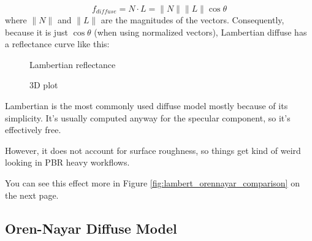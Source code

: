 \documentclass[12pt,letterpaper]{article}
\begin{document}
$$
f_{diffuse} = N \cdot L = \lVert N \rVert \lVert L \rVert \cos \theta
$$
where $\lVert N \rVert$ and $\lVert L \rVert$ are the magnitudes of the vectors. Consequently, 
because it is just $\cos \theta$ (when using normalized vectors), 
Lambertian diffuse has a reflectance curve like this:
\begin{figure}[htbp]
  \begin{minipage}[t]{0.5\linewidth}
    \centering
    \pgfplotsset{width=15em}
    \caption{Lambertian reflectance}
  \end{minipage}
  \hspace{-16pt}
  \begin{minipage}[t]{0.5\linewidth}
    \centering
	\pgfplotsset{width=20em}
    \caption{3D plot}
  \end{minipage}
\end{figure}

Lambertian is the most commonly used diffuse model mostly because of its simplicity. 
It's usually computed anyway for the specular component, so it's effectively free.

However, it does not account for surface roughness, so things get kind of weird looking in PBR heavy workflows.

You can see this effect more in Figure {\color{blue}\ref{fig:lambert_orennayar_comparison}} on the next page.

\newpage

\subsection{Oren-Nayar Diffuse Model}
\end{document}
